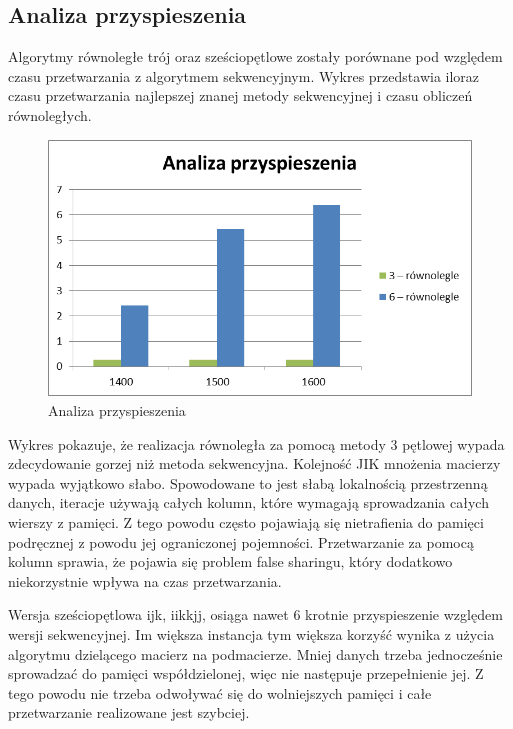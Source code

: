 \documentclass{article}
\begin{document}
\subsection{Analiza przyspieszenia}

Algorytmy równoległe trój oraz sześciopętlowe zostały porównane pod względem czasu przetwarzania z algorytmem sekwencyjnym. Wykres przedstawia iloraz czasu przetwarzania najlepszej znanej metody sekwencyjnej i czasu obliczeń równoległych.

\begin{figure}[H]
	\centering
	\includegraphics[bb=0 0 1280 960]{./images/wykresy/Analiza przyspieszenia.png}
	\caption{Analiza przyspieszenia}
	\label{fig:3medium}
\end{figure}

Wykres pokazuje, że realizacja równoległa za pomocą metody 3 pętlowej wypada zdecydowanie gorzej niż metoda sekwencyjna. Kolejność JIK mnożenia macierzy wypada wyjątkowo słabo. Spowodowane to jest słabą lokalnością przestrzenną danych, iteracje używają całych kolumn, które wymagają sprowadzania całych wierszy z pamięci. Z tego powodu często pojawiają się nietrafienia do pamięci podręcznej z powodu jej ograniczonej pojemności. Przetwarzanie za pomocą kolumn sprawia, że pojawia się problem false sharingu, który dodatkowo niekorzystnie wpływa na czas przetwarzania.

Wersja sześciopętlowa ijk, iikkjj, osiąga nawet 6 krotnie przyspieszenie względem wersji sekwencyjnej. Im większa instancja tym większa korzyść wynika z użycia algorytmu dzielącego macierz na podmacierze. Mniej danych trzeba jednocześnie sprowadzać do pamięci współdzielonej, więc nie następuje przepełnienie jej. Z tego powodu nie trzeba odwoływać się do wolniejszych pamięci i całe przetwarzanie realizowane jest szybciej. 
\end{document}
